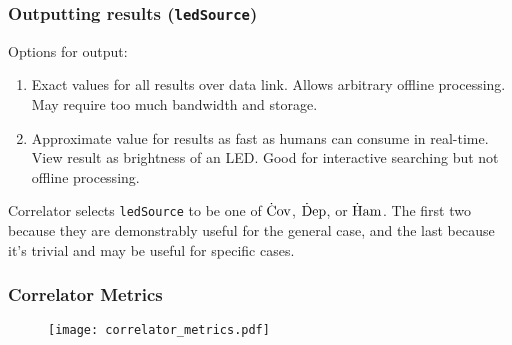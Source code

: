 \documentclass[xcolor={usenames,svgnames}]{beamer}
\begin{document}
\begin{frame} \frametitle{Outputting results (\texttt{ledSource})} %

Options for output:
\begin{enumerate}
\item Exact values for all results over data link.
  Allows arbitrary offline processing.
  May require too much bandwidth and storage.
\item Approximate value for results as fast as humans can consume in real-time.
  View result as brightness of an LED.
  Good for interactive searching but not offline processing.
\end{enumerate}

Correlator selects \texttt{ledSource} to be one of $\operatorname{\dot{C}ov}$, $\operatorname{\dot{D}ep}$, or $\operatorname{\dot{H}am}$.
The first two because they are demonstrably useful for the general case, and the
last because it's trivial and may be useful for specific cases.

\end{frame}

\begin{frame} \frametitle{Correlator Metrics} %

\begin{figure}
  \centering
  \texttt{[image: correlator\_metrics.pdf]}
\end{figure}

\end{frame}
\end{document}
